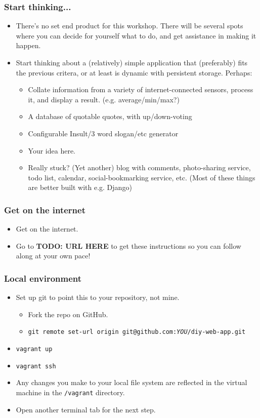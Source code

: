 \documentclass{beamer}
\begin{document}
\begin{frame}
  \frametitle{Start thinking...}
  \begin{itemize}
  \item There's no set end product for this workshop. There will be
    several spots where you can decide for yourself what to do, and
    get assistance in making it happen.

  \item Start thinking about a (relatively) simple application that
    (preferably) fits the previous critera, or at least is dynamic
    with persistent storage. Perhaps:
    \begin{itemize}
    \item Collate information from a variety of internet-connected
      sensors, process it, and display a
      result. (e.g. average/min/max?)
    \item A database of quotable quotes, with up/down-voting
    \item Configurable Insult/3 word slogan/etc
      generator
    \item Your idea here.
    \item Really stuck? (Yet another) blog with comments, photo-sharing service,
      todo list, calendar, social-bookmarking service, etc. (Most of
      these things are better built with e.g. Django)
    \end{itemize}
  \end{itemize}
\end{frame}

\begin{frame}
  \frametitle{Get on the internet}
  \begin{itemize}
  \item Get on the internet.

  \item Go to \textbf{TODO: URL HERE} to get these instructions so you
    can follow along at your own pace!
  \end{itemize}
\end{frame}


\begin{frame}
  \frametitle{Local environment}
  \begin{itemize}
  \item Set up git to point this to your repository, not mine.
    \begin{itemize}
    \item Fork the repo on GitHub.
    \item \texttt{git remote set-url origin git@github.com:\textit{YOU}/diy-web-app.git}
    \end{itemize}
  \item \texttt{vagrant up}
  \item \texttt{vagrant ssh}
  \item Any changes you make to your local file system are reflected in the virtual machine in the \texttt{/vagrant} directory.
  \item Open another terminal tab for the next step.
  \end{itemize}
\end{frame}
\end{document}
